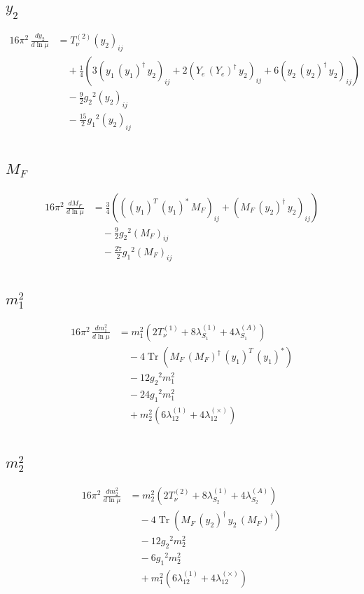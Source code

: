 \documentclass[10pt,a4paper]{article}
\begin{document}
\subsection*{$y_2$}
\begin{align*}
16\pi^2\,\frac{d y_2}{d\ln\mu} &=T_{\nu}^{(2)} \left({y_2}\right)_{ij} \\
&\quad +\frac{1}{4} (3 \left({y_1}\,\left({y_1}\right)^{\dagger}\,{y_2}\right)_{ij}+2 \left({Y_e}\,\left({Y_e}\right)^{\dagger}\,{y_2}\right)_{ij}+6 \left({y_2}\,\left({y_2}\right)^{\dagger}\,{y_2}\right)_{ij}) \\
&\quad -\frac{9}{2} {g_2}^2 \left({y_2}\right)_{ij} \\
&\quad -\frac{15}{2} {g_1}^2 \left({y_2}\right)_{ij} \\
\end{align*}
\subsection*{$M_F$}
\begin{align*}
16\pi^2\,\frac{d M_F}{d\ln\mu} &=\frac{3}{4} (\left(\left({y_1}\right)^{T}\,\left({y_1}\right)^{*}\,{M_F}\right)_{ij}+\left({M_F}\,\left({y_2}\right)^{\dagger}\,{y_2}\right)_{ij}) \\
&\quad -\frac{9}{2} {g_2}^2 \left({M_F}\right)_{ij} \\
&\quad -\frac{27}{2} {g_1}^2 \left({M_F}\right)_{ij} \\
\end{align*}
\subsection*{$m_1^2$}
\begin{align*}
16\pi^2\,\frac{d m_1^2}{d\ln\mu} &={m_1^2} (2 T_{\nu}^{(1)}+8 {\lambda_{S_1}^{(1)}}+4 {\lambda_{S_1}^{(A)}}) \\
&\quad -4 \operatorname{Tr}\!\left({M_F}\,\left({M_F}\right)^{\dagger}\,\left({y_1}\right)^{T}\,\left({y_1}\right)^{*}\right) \\
&\quad -12 {g_2}^2 {m_1^2} \\
&\quad -24 {g_1}^2 {m_1^2} \\
&\quad +{m_2^2} (6 {\lambda_{12}^{(1)}}+4 {\lambda_{12}^{(\times)}}) \\
\end{align*}
\subsection*{$m_2^2$}
\begin{align*}
16\pi^2\,\frac{d m_2^2}{d\ln\mu} &={m_2^2} (2 T_{\nu}^{(2)}+8 {\lambda_{S_2}^{(1)}}+4 {\lambda_{S_2}^{(A)}}) \\
&\quad -4 \operatorname{Tr}\!\left({M_F}\,\left({y_2}\right)^{\dagger}\,{y_2}\,\left({M_F}\right)^{\dagger}\right) \\
&\quad -12 {g_2}^2 {m_2^2} \\
&\quad -6 {g_1}^2 {m_2^2} \\
&\quad +{m_1^2} (6 {\lambda_{12}^{(1)}}+4 {\lambda_{12}^{(\times)}}) \\
\end{align*}
\end{document}
